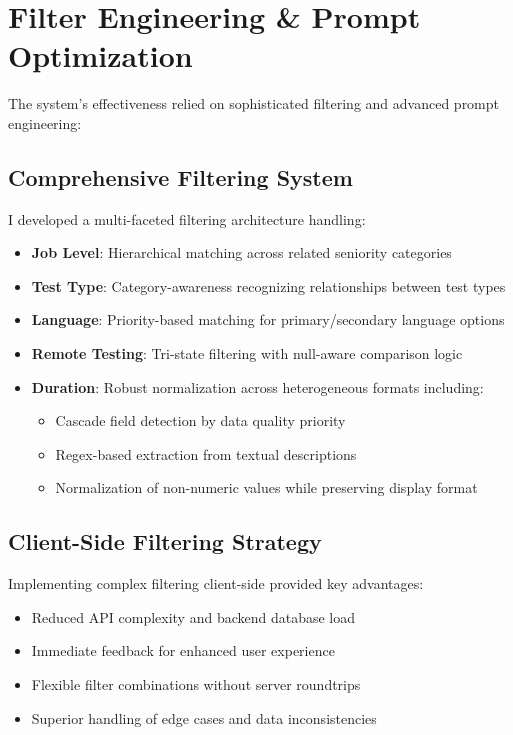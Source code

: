 \documentclass[9pt,a4paper,twocolumn]{article}
\begin{document}
\section{\fontsize{9}{11}\selectfont Filter Engineering \& Prompt Optimization}
\fontsize{8}{10}\selectfont
The system's effectiveness relied on sophisticated filtering and advanced prompt engineering:

\subsection{\fontsize{8.5}{10}\selectfont Comprehensive Filtering System}
I developed a multi-faceted filtering architecture handling:
\begin{itemize}
    \item \textbf{Job Level}: Hierarchical matching across related seniority categories
    \item \textbf{Test Type}: Category-awareness recognizing relationships between test types
    \item \textbf{Language}: Priority-based matching for primary/secondary language options
    \item \textbf{Remote Testing}: Tri-state filtering with null-aware comparison logic
    \item \textbf{Duration}: Robust normalization across heterogeneous formats including:
        \begin{itemize}
            \item Cascade field detection by data quality priority
            \item Regex-based extraction from textual descriptions
            \item Normalization of non-numeric values while preserving display format
        \end{itemize}
\end{itemize}

\subsection{\fontsize{8.5}{10}\selectfont Client-Side Filtering Strategy}
Implementing complex filtering client-side provided key advantages:
\begin{itemize}
    \item Reduced API complexity and backend database load
    \item Immediate feedback for enhanced user experience
    \item Flexible filter combinations without server roundtrips
    \item Superior handling of edge cases and data inconsistencies
\end{itemize}
\end{document}
